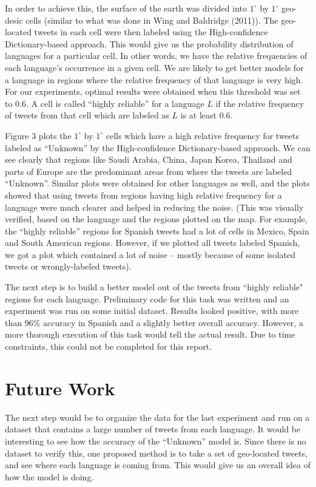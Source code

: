 \documentclass[11pt]{article}
\begin{document}
In order to achieve this, the surface of the earth was divided into $1^{\circ}$ by $1^{\circ}$ geo-desic cells (similar to what was done in Wing and Baldridge (2011)). The geo-located tweets in each cell were then labeled using the High-confidence Dictionary-based approach. This would give us the probability distribution of languages for a particular cell. In other words, we have the relative frequencies of each language's occurrence in a given cell. We are likely to get better models for a language in regions where the relative frequency of that language is very high. For our experiments, optimal results were obtained when this threshold was set to 0.6. A cell is called ``highly reliable'' for a language $L$ if the relative frequency of tweets from that cell which are labeled as $L$ is at least 0.6.

Figure 3 plots the $1^{\circ}$ by $1^{\circ}$ cells which have a high relative frequency for tweets labeled as ``Unknown'' by the High-confidence Dictionary-based approach. We can see clearly that regions like Saudi Arabia, China, Japan Korea, Thailand and parts of Europe are the predominant areas from where the tweets are labeled ``Unknown''. Similar plots were obtained for other languages as well, and the plots showed that using tweets from regions having high relative frequency for a language were much clearer and helped in reducing the noise. (This was visually verified, based on the language and the regions plotted on the map. For example, the ``highly reliable'' regions for Spanish tweets had a lot of cells in Mexico, Spain and South American regions. However, if we plotted all tweets labeled Spanish, we got a plot which contained a lot of noise -- mostly because of some isolated tweets or wrongly-labeled tweets).

The next step is to build a better model out of the tweets from ``highly reliable" regions for each language. Preliminary code for this task was written and an experiment was run on some initial dataset. Results looked positive, with more than 96\% accuracy in Spanish and a slightly better overall accuracy. However, a more thorough execution of this task would tell the actual result. Due to time constraints, this could not be completed for this report.

\section {Future Work}
The next step would be to organize the data for the last experiment and run on a dataset that contains a large number of tweets from each language. It would be interesting to see how the accuracy of the ``Unknown'' model is. Since there is no dataset to verify this, one proposed method is to take a set of geo-located tweets, and see where each language is coming from. This would give us an overall idea of how the model is doing.
\end{document}
